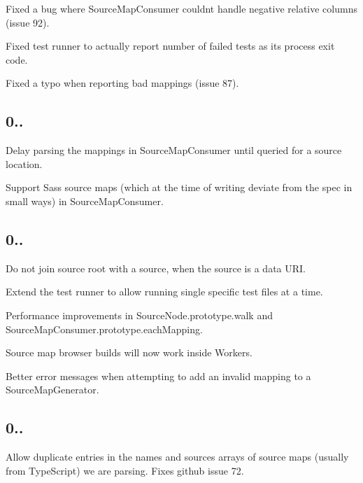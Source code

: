 \begin{DoxyItemize}
\item Fixed a bug where Source\+Map\+Consumer couldn\textquotesingle{}t handle negative relative columns (issue 92).
\item Fixed test runner to actually report number of failed tests as its process exit code.
\item Fixed a typo when reporting bad mappings (issue 87).
\end{DoxyItemize}

\subsection*{0..}


\begin{DoxyItemize}
\item Delay parsing the mappings in Source\+Map\+Consumer until queried for a source location.
\item Support Sass source maps (which at the time of writing deviate from the spec in small ways) in Source\+Map\+Consumer.
\end{DoxyItemize}

\subsection*{0..}


\begin{DoxyItemize}
\item Do not join source root with a source, when the source is a data U\+R\+I.
\item Extend the test runner to allow running single specific test files at a time.
\item Performance improvements in {\ttfamily Source\+Node.\+prototype.\+walk} and {\ttfamily Source\+Map\+Consumer.\+prototype.\+each\+Mapping}.
\item Source map browser builds will now work inside Workers.
\item Better error messages when attempting to add an invalid mapping to a {\ttfamily Source\+Map\+Generator}.
\end{DoxyItemize}

\subsection*{0..}


\begin{DoxyItemize}
\item Allow duplicate entries in the {\ttfamily names} and {\ttfamily sources} arrays of source maps (usually from Type\+Script) we are parsing. Fixes github issue 72.
\end{DoxyItemize}

